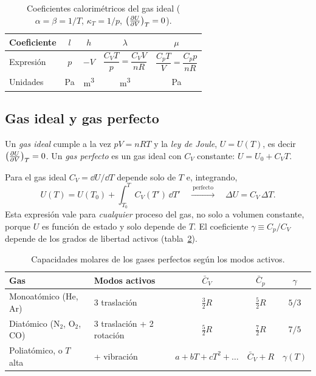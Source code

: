\begin{table}[htbp]
\centering
\caption{Coeficientes calorimétricos del gas ideal ($\alpha=\beta=1/T$, $\kappa_T=1/p$, $\bigl(\tfrac{\partial U}{\partial V}\bigr)_{T}=0$).}
\label{tab:calorim}
\small
\renewcommand{\arraystretch}{1.5}
\begin{tabular}{lcccc}
\toprule
Coeficiente & $l$ & $h$ & $\lambda$ & $\mu$\\
\midrule
Expresión & $p$ & $-V$ & $\dfrac{C_VT}{p}=\dfrac{C_VV}{nR}$ & $\dfrac{C_pT}{V}=\dfrac{C_pp}{nR}$\\
Unidades & \si{Pa} & \si{m^3} & \si{m^3} & \si{Pa}\\
\bottomrule
\end{tabular}
\end{table}

\subsection{Gas ideal y gas perfecto}

\begin{definicion}
Un \emph{gas ideal} cumple a la vez $pV=nRT$ y la \emph{ley de Joule}, $U=U(T)$, es decir
$\bigl(\tfrac{\partial U}{\partial V}\bigr)_{T}=0$. Un \emph{gas perfecto} es un gas ideal con $C_V$ constante: $U=U_0+C_VT$.
\end{definicion}

Para el gas ideal $C_V=\dd U/\dd T$ depende solo de $T$ e, integrando,
\begin{equation}\label{eq:UT}
  U(T)=U(T_0)+\int_{T_0}^{T}C_V(T')\,\dd T'\quad\xrightarrow{\ \text{perfecto}\ }\quad \Delta U=C_V\,\Delta T .
\end{equation}
Esta expresión vale para \emph{cualquier} proceso del gas, no solo a volumen constante, porque $U$ es función
de estado y solo depende de $T$. El coeficiente $\gamma\equiv C_p/C_V$ depende de los grados de libertad
activos (tabla~\ref{tab:gdl}).

\begin{table}[htbp]
\centering
\caption{Capacidades molares de los gases perfectos según los modos activos.}
\label{tab:gdl}
\small
\renewcommand{\arraystretch}{1.4}
\begin{tabular}{llccc}
\toprule
Gas & Modos activos & $\bar C_V$ & $\bar C_p$ & $\gamma$\\
\midrule
Monoatómico (He, Ar) & 3 traslación & $\tfrac32R$ & $\tfrac52R$ & $5/3$\\
Diatómico (N$_2$, O$_2$, CO) & 3 traslación + 2 rotación & $\tfrac52R$ & $\tfrac72R$ & $7/5$\\
Poliatómico, o $T$ alta & + vibración & $a+bT+cT^2+\dots$ & $\bar C_V+R$ & $\gamma(T)$\\
\bottomrule
\end{tabular}
\end{table}


